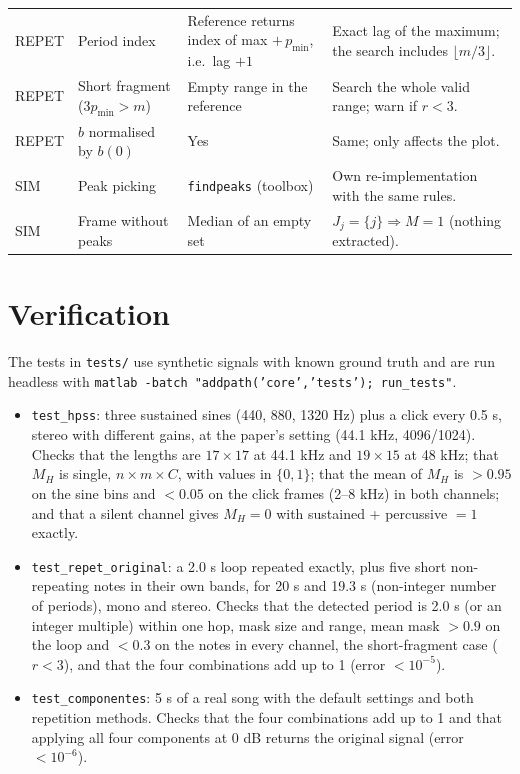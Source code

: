 \documentclass[11pt,a4paper]{article}
\newcommand{\code}[1]{\texttt{#1}}
\begin{document}
\begin{table}[htbp]
\begin{tabularx}{\linewidth}{@{}p{2.1cm}p{3.6cm}LL@{}}
REPET & Period index & Reference returns index of max $+\,p_{\min}$, i.e.\ lag $+1$ & Exact lag of the maximum; the search includes $\lfloor m/3\rfloor$. \\
REPET & Short fragment ($3p_{\min}>m$) & Empty range in the reference & Search the whole valid range; warn if $r<3$. \\
REPET & $b$ normalised by $b(0)$ & Yes & Same; only affects the plot. \\
\addlinespace
SIM & Peak picking & \code{findpeaks} (toolbox) & Own re-implementation with the same rules. \\
SIM & Frame without peaks & Median of an empty set & $J_j=\{j\}\Rightarrow M=1$ (nothing extracted). \\
\bottomrule
\end{tabularx}
\end{table}

\section{Verification}
\label{sec:tests}

The tests in \code{tests/} use synthetic signals with known ground truth
and are run headless with
\code{matlab -batch "addpath('core','tests'); run\_tests"}.

\begin{itemize}
  \item \code{test\_hpss}: three sustained sines (440, 880, 1320 Hz) plus a
        click every 0.5 s, stereo with different gains, at the paper's
        setting (44.1 kHz, 4096/1024). Checks that the lengths are
        $17\times17$ at 44.1 kHz and $19\times15$ at 48 kHz; that $M_H$ is
        single, $n\times m\times C$, with values in $\{0,1\}$; that the mean
        of $M_H$ is $>0.95$ on the sine bins and $<0.05$ on the click frames
        (2--8 kHz) in both channels; and that a silent channel gives
        $M_H=0$ with sustained + percussive $=1$ exactly.
  \item \code{test\_repet\_original}: a 2.0 s loop repeated exactly, plus
        five short non-repeating notes in their own bands, for 20 s and
        19.3 s (non-integer number of periods), mono and stereo. Checks that
        the detected period is 2.0 s (or an integer multiple) within one hop,
        mask size and range, mean mask $>0.9$ on the loop and $<0.3$ on the
        notes in every channel, the short-fragment case ($r<3$), and that the
        four combinations add up to 1 (error $<10^{-5}$).
  \item \code{test\_componentes}: 5 s of a real song with the default
        settings and both repetition methods. Checks that the four
        combinations add up to 1 and that applying all four components at
        0 dB returns the original signal (error $<10^{-6}$).
\end{itemize}
\end{document}
